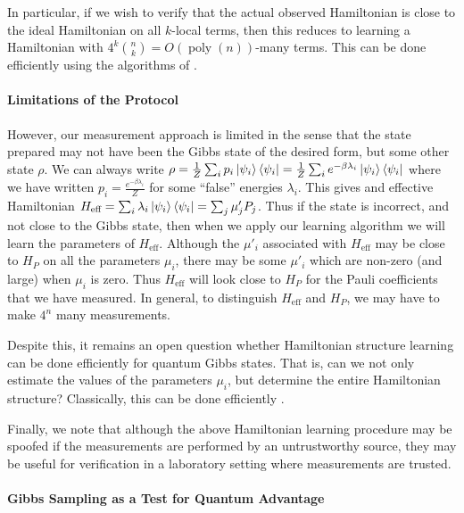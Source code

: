 \documentclass[a4paper,onecolumn,11pt,accepted=2017-05-09]{quantumarticle}
\DeclareMathOperator{\poly}{poly}
\begin{document}
 In particular, if we wish to verify that the actual observed Hamiltonian is close to the ideal Hamiltonian on all $k$-local terms, then this reduces to learning a Hamiltonian with $4^k\binom{n}{k}=O(\poly(n))$-many terms.
 This can be done efficiently using the algorithms of \cite{bakshi2023learning}.

\paragraph{Limitations of the Protocol}
 However, our measurement approach is limited in the sense that the state prepared may not have been the Gibbs state of the desired form, but some other state $\rho$.
 We can always write $\rho = \frac{1}{Z}\sum_i p_i \ket{\psi_i}\bra{\psi_i} = \frac{1}{Z}\sum_i e^{-\beta \lambda_i} \ket{\psi_i}\bra{\psi_i}$ where we have written $p_i = \frac{e^{-\beta \lambda_i}}{Z}$ for some ``false'' energies $\lambda_i$.
 This gives and effective Hamiltonian $H_{\text{eff}} = \sum_i \lambda_i \ket{\psi_i}\bra{\psi_i} = \sum_j \mu'_j P_j$.
 Thus if the state is incorrect, and not close to the Gibbs state, then when we apply our learning algorithm we will learn the parameters of $H_{\text{eff}}$.
 Although the $\mu'_i$ associated with $H_{\text{eff}}$ may be close to $H_P$ on all the parameters $\mu_i$, there may be some $\mu'_i$ which are non-zero (and large) when $\mu_i$ is zero.
 Thus $H_{\text{eff}}$ will look close to $H_P$ for the Pauli coefficients that we have measured.
 In general, to distinguish $H_{\text{eff}}$ and $H_P$, we may have to make $4^n$ many measurements.
 
 Despite this, it remains an open question whether Hamiltonian structure learning can be done efficiently for quantum Gibbs states.
 That is, can we not only estimate the values of the parameters $\mu_i$, but determine the entire Hamiltonian structure?
 Classically, this can be done efficiently \cite{vuffray2016interaction,klivans2017learning}.

Finally, we note that although the above Hamiltonian learning procedure may be spoofed if the measurements are performed by an untrustworthy source, they may be useful for verification in a laboratory setting where measurements are trusted.

\paragraph{Gibbs Sampling as a Test for Quantum Advantage}
\end{document}

